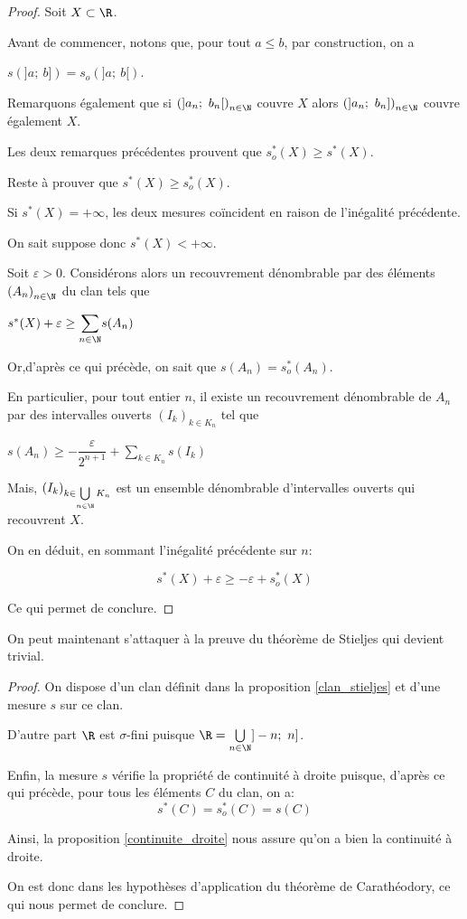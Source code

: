 \begin{proof}
Soit $X \subset \R$.

Avant de commencer, notons que, pour tout $a \leq b$, par construction, on a

$s(]a;~b]) = s_o(]a;~b[)$.

Remarquons également que si $\left(]a_n;~b_n[\right)_{n \in \N}$ couvre $X$ alors $\left(]a_n;~b_n]\right)_{n \in \N}$ couvre également $X$.

Les deux remarques précédentes prouvent que $s_o^{*}(X) \geq s^{*}(X)$.

Reste à prouver que $s^{*}(X) \geq s_o^{*}(X)$.

Si  $s^{*}(X) = +\infty$, les deux mesures coïncident en raison de l'inégalité précédente.

On sait suppose donc $s^{*}(X) < +\infty$.

Soit $\varepsilon>0$. Considérons alors un recouvrement dénombrable par des éléments $\left(A_n\right)_{n \in \N}$ du clan tels que

$
s^{*}(X) + \varepsilon \geq \displaystyle{\sum \limits_{n \in \N}} s(A_n)
$

Or,d'après ce qui précède, on sait que $s(A_n) = s_o^{*}(A_n)$.

En particulier, pour tout entier $n$, il existe un recouvrement dénombrable de $A_n$ par des intervalles ouverts $\left(I_k\right)_{k \in K_n}$ tel que

$
s(A_n) \geq - \dfrac{\varepsilon}{2^{n+1}} + \displaystyle{\sum \limits_{k \in K_n}} s(I_k)
$

Mais, $\left(I_k\right)_{k \in \bigcup \limits_{n \in \N} K_n}$ est un ensemble dénombrable d'intervalles ouverts qui recouvrent $X$.

On en déduit, en sommant l'inégalité précédente sur $n$:

\[
s^{*}(X) + \varepsilon \geq -\varepsilon + s_o^{*}(X)
\]

Ce qui permet de conclure.
\end{proof}


On peut maintenant s'attaquer à la preuve du théorème de Stieljes qui devient trivial.

\begin{proof}
On dispose d'un clan définit dans la proposition \ref{clan_stieljes} et d'une mesure $s$ sur ce clan.

D'autre part $\R$ est $\sigma$-fini puisque $\R = \bigcup \limits_{n \in \N} ]-n;~n]$.

Enfin, la mesure $s$ vérifie la propriété de continuité à droite puisque, d'après ce qui précède, pour tous les éléments $C$ du clan, on a:
\[
s^{*}(C) = s_o^{*}(C)= s(C)
\]

Ainsi, la proposition \ref{continuite_droite} nous assure qu'on a bien la continuité à droite.

On est donc dans les hypothèses d'application du théorème de Carathéodory, ce qui nous permet de conclure.
\end{proof}


